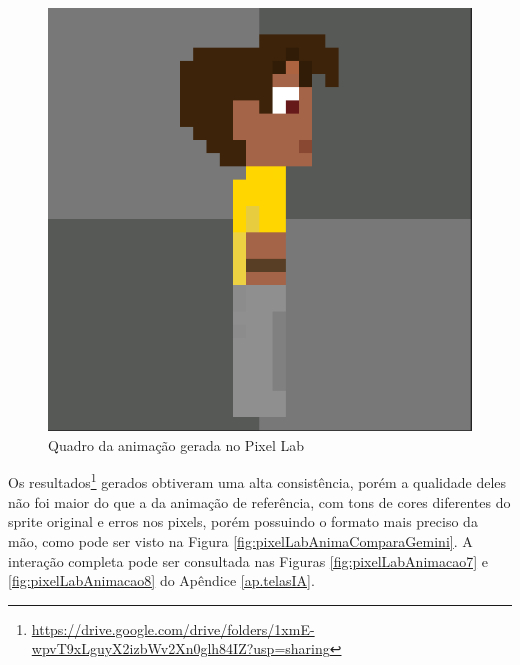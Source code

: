 \begin{figure}[htbp]
    \centering
    \caption{\small Quadro da animação gerada no Pixel Lab}
    \label{fig:pixelLabAniSideViewSprite2}
    \includegraphics[width=0.4\linewidth]{figs/pixelLab/dia3/fix_oficial_fundo_igual.PNG}
\end{figure}

Os resultados\footnote{\url{https://drive.google.com/drive/folders/1xmE-wpvT9xLguyX2izbWv2Xn0glh84IZ?usp=sharing}} gerados obtiveram uma alta consistência, porém a qualidade deles não foi maior do que a da animação de referência, com tons de cores diferentes do sprite original e erros nos pixels, porém possuindo o formato mais preciso da mão, como pode ser visto na Figura \ref{fig:pixelLabAnimaComparaGemini}. A interação completa pode ser consultada nas Figuras \ref{fig:pixelLabAnimacao7} e \ref{fig:pixelLabAnimacao8} do Apêndice \ref{ap.telasIA}. 

